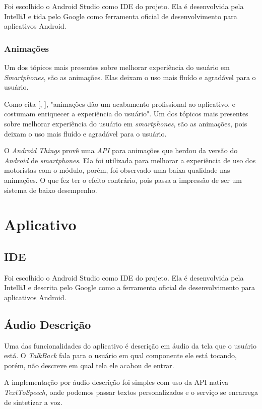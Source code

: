 \documentclass[
	12pt,				%
	oneside,			%
	a4paper,			%
	brazil				%
]{abntex2}
\newcommand{\citecustom}[1]{[\citeauthoronline{#1}, \citeyear{#1}]}
\begin{document}
Foi escolhido o Android Studio como IDE do projeto. Ela é desenvolvida pela IntelliJ e tida pelo Google como ferramenta oficial de desenvolvimento para aplicativos Android.

\subsubsection{Animações}

Um dos tópicos mais presentes sobre melhorar experiência do usuário em \textit{Smartphones}, são as animações. Elas deixam o uso mais fluído e agradável para o usuário. 

Como cita \citecustom{Lecheta2015}, "animações dão um acabamento profissional ao aplicativo, e costumam enriquecer a experiência do usuário". Um dos tópicos mais presentes sobre melhorar experiência do usuário em \textit{smartphones}, são as animações, pois deixam o uso mais fluído e agradável para o usuário.

O \textit{Android Things} provê uma \textit{API} para animações que herdou da versão do \textit{Android} de \textit{smartphones}. Ela foi utilizada para melhorar a experiência de uso dos motoristas com o módulo, porém, foi observado uma baixa qualidade nas animações. O que fez ter o efeito contrário, pois passa a impressão de ser um sistema de baixo desempenho.

\section{Aplicativo}

\subsection{IDE}

Foi escolhido o Android Studio como IDE do projeto. Ela é desenvolvida pela IntelliJ e descrita pelo Google como a ferramenta oficial de desenvolvimento para aplicativos Android.

\subsection{Áudio Descrição}

Uma das funcionalidades do aplicativo é descrição em áudio da tela que o usuário está. O \textit{TalkBack} fala para o usuário em qual componente ele está tocando, porém, não descreve em qual tela ele acabou de entrar. 

A implementação por áudio descrição foi simples com uso da API nativa \textit{TextToSpeech}, onde podemos passar textos personalizados e o serviço se encarrega de sintetizar a voz.
\end{document}

